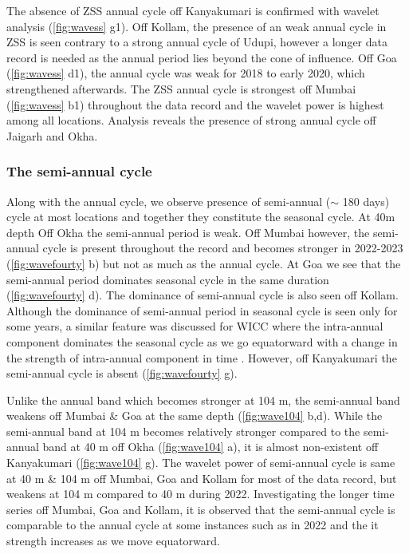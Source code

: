 \documentclass{article}
\begin{document}
	The absence of ZSS annual cycle off Kanyakumari is confirmed with wavelet analysis (\cref{fig:wavess} g1). Off Kollam, the presence of an weak annual cycle in ZSS is seen contrary to a strong annual cycle of Udupi, however a longer data record is needed as the annual period lies beyond the cone of influence. Off Goa (\cref{fig:wavess} d1), the annual cycle was weak for 2018 to early 2020, which strengthened afterwards. The ZSS annual cycle is strongest off Mumbai (\cref{fig:wavess} b1) throughout the data record and the wavelet power is highest among all locations. Analysis reveals the presence of strong annual cycle off Jaigarh and Okha.
	
	\subsubsection{The semi-annual cycle}
	Along with the annual cycle, we observe presence of semi-annual ($\sim$ 180 days) cycle at most locations and together they constitute the seasonal cycle. At 40m depth Off Okha the semi-annual period is weak. Off Mumbai however, the semi-annual cycle is present throughout the record and becomes stronger in 2022-2023 (\cref{fig:wavefourty} b) but not as much as the annual cycle. At Goa we see that the semi-annual period dominates seasonal cycle in the same duration (\cref{fig:wavefourty} d). The dominance of semi-annual cycle is also seen off Kollam. Although the dominance of semi-annual period in seasonal cycle is seen only for some years, a similar feature was discussed for WICC where the intra-annual component dominates the seasonal cycle as we go equatorward with a change in the strength of intra-annual component in time \citep{chaudhuri2020observed}. However, off Kanyakumari the semi-annual cycle is absent (\cref{fig:wavefourty} g).

	Unlike the annual band which becomes stronger at 104 m, the semi-annual band weakens off Mumbai \& Goa at the same depth (\cref{fig:wave104} b,d). While the semi-annual band at 104 m becomes relatively stronger compared to the semi-annual band at 40 m off Okha (\cref{fig:wave104} a), it is almost non-existent off Kanyakumari (\cref{fig:wave104} g). The wavelet power of semi-annual cycle is same at 40 m \& 104 m off Mumbai, Goa and Kollam for most of the data record, but weakens at 104 m compared to 40 m during 2022. Investigating the longer time series off Mumbai, Goa and Kollam, it is observed that the semi-annual cycle is comparable to the annual cycle at some instances such as in 2022 and the it strength increases as we move equatorward.
\end{document}

